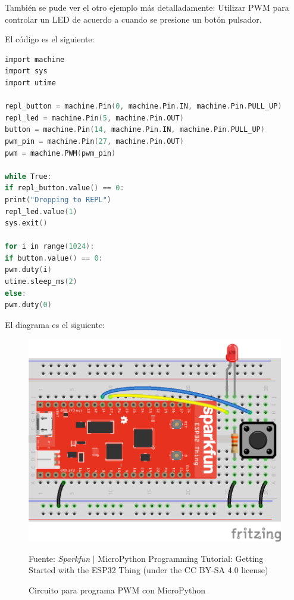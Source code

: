 \documentclass[conference]{IEEEtran}
\begin{document}
También se pude ver el otro ejemplo más detalladamente: Utilizar PWM para
controlar un LED de acuerdo a cuando se presione un botón pulsador.

\bigbreak

El código es el siguiente:

\begin{lstlisting}[language=C, caption={Programa que utiliza PWM en
MicroPython para ESP32. Fuente: Sparkfun Electronics \cite{hymel}.}]
import machine
import sys
import utime

repl_button = machine.Pin(0, machine.Pin.IN, machine.Pin.PULL_UP)
repl_led = machine.Pin(5, machine.Pin.OUT)
button = machine.Pin(14, machine.Pin.IN, machine.Pin.PULL_UP)
pwm_pin = machine.Pin(27, machine.Pin.OUT)
pwm = machine.PWM(pwm_pin)

while True:
if repl_button.value() == 0:
print("Dropping to REPL")
repl_led.value(1)
sys.exit()

for i in range(1024):
if button.value() == 0:
pwm.duty(i)
utime.sleep_ms(2)
else:
pwm.duty(0)
\end{lstlisting}

El diagrama es el siguiente:

\begin{figure}[H]
\centering
\includegraphics[width=0.3\paperwidth]{images/esp32-micropython-pwm-circuit}
\caption{Circuito para programa PWM con MicroPython} \footnotesize
Fuente: \textit{Sparkfun} $\mid$ MicroPython Programming Tutorial: Getting
Started with the ESP32 Thing \cite{hymel} (under the CC BY-SA 4.0 license)
\end{figure}
\end{document}
